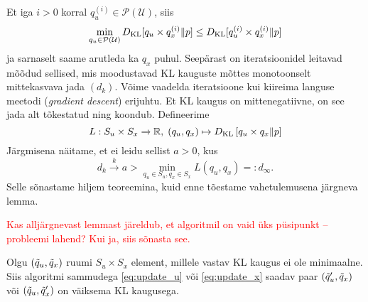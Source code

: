 Et iga $i>0$ korral $q_u^{(i)} \in \mathcal{P}(\mathcal{U})$, siis
$$ \min_{q_u \in \mathcal{P}(\mathcal{U})} D_{\mathrm{KL}}[q_u \times q_x^{(i)} \| p] \le D_{\mathrm{KL}}[q_u^{(i)} \times q_x^{(i)} \| p]$$
ja sarnaselt saame arutleda ka $q_x$ puhul. Seepärast on iteratsioonidel leitavad mõõdud sellised, mis moodustavad KL kauguste mõttes monotoonselt mittekasvava jada $(d_k)$. Võime vaadelda iteratsioone kui kiireima languse meetodi (\emph{gradient descent}) erijuhtu. Et KL kaugus on mittenegatiivne, on see jada alt tõkestatud ning koondub. Defineerime 
$$ L: S_u \times S_x \xrightarrow[]{} \mathbb{R}, \; (q_u, q_x) \mapsto D_{\mathrm{KL}} \left[ q_u \times q_x \| p \right] $$
Järgmisena näitame, et ei leidu sellist $a>0$, kus
$$d_k \xrightarrow[]{k} a > \min_{q_u \in S_u, q_x \in S_x} L(q_u, q_x) =: d_\infty.$$ Selle sõnastame hiljem teoreemina, kuid enne tõestame vahetulemusena järgneva lemma.


\textcolor{red}{Kas alljärgnevast lemmast järeldub, et algoritmil on vaid üks püsipunkt -- probleemi lahend? Kui ja, siis sõnasta see.}

\begin{lemma}
\label{lemma:update_decreases_kl}
Olgu $(\Tilde{q}_u, \Tilde{q}_x)$ ruumi $S_u \times S_x$ element, millele vastav KL kaugus ei ole minimaalne. Siis algoritmi sammudega \eqref{eq:update_u} või \eqref{eq:update_x} saadav paar $(\Tilde{q}'_u, \Tilde{q}_x)$ või $(\Tilde{q}_u, \Tilde{q}'_x)$ on väiksema KL kaugusega.
\end{lemma}

